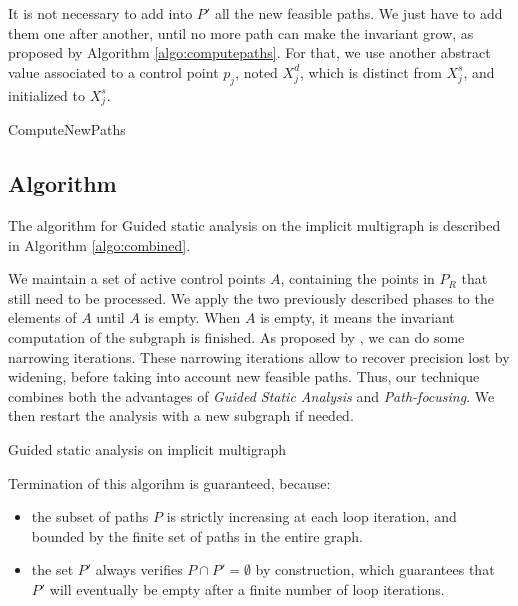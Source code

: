 \documentclass[preprint]{sigplanconf}
\begin{document}
It is not necessary to add into $P'$ all the new feasible paths. We just have
to add them one after another, until no more path can make the invariant grow,
as proposed by Algorithm \ref{algo:computepaths}. For that, we use another
abstract value associated to a control point $p_j$, noted $X_j^d$, which is
distinct from $X_j^s$, and initialized to $X_j^s$.

\begin{algorithm}
	\caption{ComputeNewPaths}
	\label{algo:computepaths}
	\begin{algorithmic}[1] 
	
	\end{algorithmic}
\end{algorithm}

\subsection{Algorithm}

The algorithm for Guided static analysis on the implicit multigraph is described
in Algorithm \ref{algo:combined}.

We maintain a set of active control points $A$, containing the points in $P_R$
that still need to be processed. We apply the two previously described phases to
the elements of $A$ until $A$ is empty. When $A$ is empty, it means the
invariant computation of the subgraph is finished. As proposed by
\citet{DBLP:conf/sas/GopanR07}, we can do some narrowing iterations.
These narrowing iterations allow to recover precision lost by
widening, before taking into account new feasible paths.
Thus, our technique combines both the advantages of \emph{Guided Static
Analysis} and \emph{Path-focusing}.
We then restart the analysis with a new subgraph if needed.

\begin{algorithm}
	\caption{Guided static analysis on implicit multigraph}
	\label{algo:combined}
	\begin{algorithmic}[1] 
	
	\end{algorithmic}
\end{algorithm}

Termination of this algorihm is guaranteed, because:
\begin{itemize}
\item 
the subset of paths $P$ is
strictly increasing at each loop iteration, and bounded by the finite set of
paths in the entire graph. 
\item the set $P'$ always verifies $P \cap P' = \emptyset$ by construction, 
which guarantees that $P'$
will eventually be empty after a finite number of loop iterations.
\end{itemize}
\end{document}
